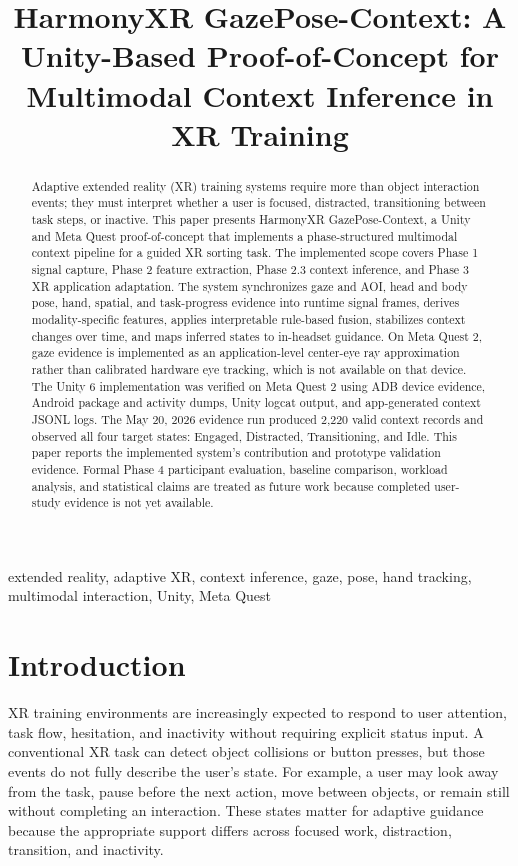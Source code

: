 \documentclass[conference]{IEEEtran}
\title{HarmonyXR GazePose-Context: A Unity-Based Proof-of-Concept for Multimodal Context Inference in XR Training}
\author{
\IEEEauthorblockN{Varun Siddaraju}
\IEEEauthorblockA{varunsiddaraju@gmail.com}
\and
\IEEEauthorblockN{Lavanya D.}
\IEEEauthorblockA{lavanyad.insight@gmail.com}
}
\begin{document}
\maketitle

\begin{abstract}
Adaptive extended reality (XR) training systems require more than object interaction events; they must interpret whether a user is focused, distracted, transitioning between task steps, or inactive. This paper presents HarmonyXR GazePose-Context, a Unity and Meta Quest proof-of-concept that implements a phase-structured multimodal context pipeline for a guided XR sorting task. The implemented scope covers Phase 1 signal capture, Phase 2 feature extraction, Phase 2.3 context inference, and Phase 3 XR application adaptation. The system synchronizes gaze and AOI, head and body pose, hand, spatial, and task-progress evidence into runtime signal frames, derives modality-specific features, applies interpretable rule-based fusion, stabilizes context changes over time, and maps inferred states to in-headset guidance. On Meta Quest 2, gaze evidence is implemented as an application-level center-eye ray approximation rather than calibrated hardware eye tracking, which is not available on that device. The Unity 6 implementation was verified on Meta Quest 2 using ADB device evidence, Android package and activity dumps, Unity logcat output, and app-generated context JSONL logs. The May 20, 2026 evidence run produced 2,220 valid context records and observed all four target states: Engaged, Distracted, Transitioning, and Idle. This paper reports the implemented system's contribution and prototype validation evidence. Formal Phase 4 participant evaluation, baseline comparison, workload analysis, and statistical claims are treated as future work because completed user-study evidence is not yet available.
\end{abstract}

\begin{IEEEkeywords}
extended reality, adaptive XR, context inference, gaze, pose, hand tracking, multimodal interaction, Unity, Meta Quest
\end{IEEEkeywords}

\section{Introduction}
XR training environments are increasingly expected to respond to user attention, task flow, hesitation, and inactivity without requiring explicit status input. A conventional XR task can detect object collisions or button presses, but those events do not fully describe the user's state. For example, a user may look away from the task, pause before the next action, move between objects, or remain still without completing an interaction. These states matter for adaptive guidance because the appropriate support differs across focused work, distraction, transition, and inactivity.
\end{document}
